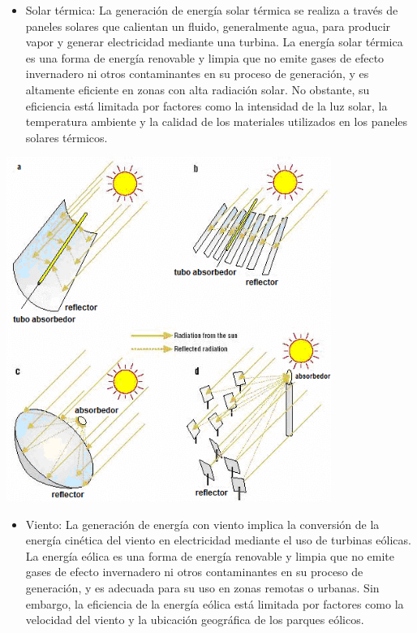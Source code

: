 \documentclass[
]{article}
\providecommand{\tightlist}{%
  \setlength{\itemsep}{0pt}\setlength{\parskip}{0pt}}
\begin{document}
\begin{itemize}
\tightlist
\item
  Solar térmica: La generación de energía solar térmica se realiza a
  través de paneles solares que calientan un fluido, generalmente agua,
  para producir vapor y generar electricidad mediante una turbina. La
  energía solar térmica es una forma de energía renovable y limpia que
  no emite gases de efecto invernadero ni otros contaminantes en su
  proceso de generación, y es altamente eficiente en zonas con alta
  radiación solar. No obstante, su eficiencia está limitada por factores
  como la intensidad de la luz solar, la temperatura ambiente y la
  calidad de los materiales utilizados en los paneles solares térmicos.
\end{itemize}

\includegraphics[width=4.16667in,height=\textheight]{termico.png}

\begin{itemize}
\tightlist
\item
  Viento: La generación de energía con viento implica la conversión de
  la energía cinética del viento en electricidad mediante el uso de
  turbinas eólicas. La energía eólica es una forma de energía renovable
  y limpia que no emite gases de efecto invernadero ni otros
  contaminantes en su proceso de generación, y es adecuada para su uso
  en zonas remotas o urbanas. Sin embargo, la eficiencia de la energía
  eólica está limitada por factores como la velocidad del viento y la
  ubicación geográfica de los parques eólicos.
\end{itemize}
\end{document}

